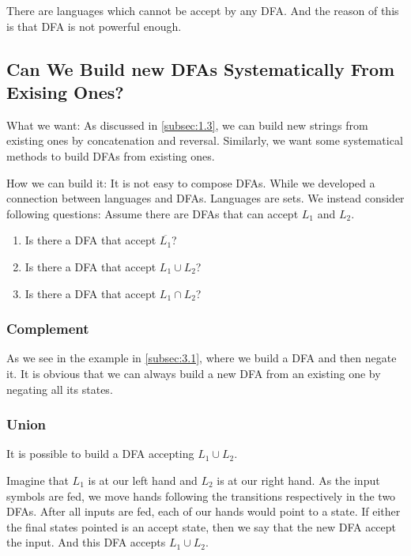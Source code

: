 \documentclass[11pt]{article}
\begin{document}
There are languages which cannot be accept by any DFA. And the reason of this is that
DFA is not powerful enough.

\subsection{Can We Build new DFAs Systematically From Exising Ones?} \label{subsec:3.3}

What we want: As discussed in \ref{subsec:1.3}, we can build new strings from
existing ones by concatenation and reversal. Similarly, we want some systematical
methods to build DFAs from existing ones.

How we can build it: It is not easy to compose DFAs. While we developed a connection
between languages and DFAs. Languages are sets. We instead consider following
questions:
Assume there are DFAs that can accept $L_1$ and $L_2$.
\begin{enumerate}
\item Is there a DFA that accept $\overline{L_1}$?
\item Is there a DFA that accept $L_1 \cup L_2$?
\item Is there a DFA that accept $L_1 \cap L_2$?
\end{enumerate}

\subsubsection{Complement}

As we see in the example in \ref{subsec:3.1}, where we build a DFA and then negate
it. It is obvious that we can always build a new DFA from an existing one by negating
all its states.

\subsubsection{Union} \label{subsubsec:3.3.2}

It is possible to build a DFA accepting $L_1 \cup L_2$.

Imagine that $L_1$ is at our left hand and $L_2$ is at our right hand. As the input
symbols are fed, we move hands following the transitions respectively in the two DFAs. After all inputs are fed, each of our hands would point to a state. If either
the final states pointed is an accept state, then we say that the new DFA accept
the input. And this DFA accepts $L_1 \cup L_2$.
\end{document}
